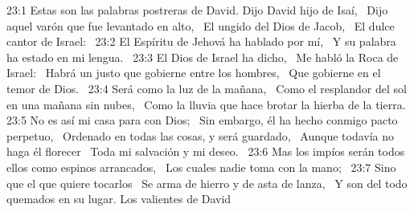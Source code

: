 23:1 Estas son las palabras postreras de David. 
Dijo David hijo de Isaí,  
Dijo aquel varón que fue levantado en alto,  
El ungido del Dios de Jacob,  
El dulce cantor de Israel:  
23:2 El Espíritu de Jehová ha hablado por mí,  
Y su palabra ha estado en mi lengua.  
23:3 El Dios de Israel ha dicho,  
Me habló la Roca de Israel:  
Habrá un justo que gobierne entre los hombres,  
Que gobierne en el temor de Dios.  
23:4 Será como la luz de la mañana,  
Como el resplandor del sol en una mañana sin nubes,  
Como la lluvia que hace brotar la hierba de la tierra.  
23:5 No es así mi casa para con Dios;  
Sin embargo, él ha hecho conmigo pacto perpetuo,  
Ordenado en todas las cosas, y será guardado,  
Aunque todavía no haga él florecer  
Toda mi salvación y mi deseo.  
23:6 Mas los impíos serán todos ellos como espinos arrancados,  
Los cuales nadie toma con la mano;  
23:7 Sino que el que quiere tocarlos  
Se arma de hierro y de asta de lanza,  
Y son del todo quemados en su lugar. 
Los valientes de David  

